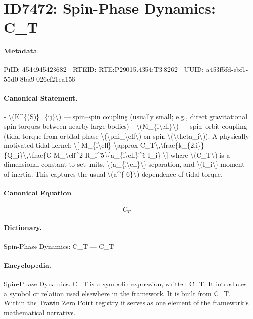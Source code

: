 \section*{ID7472: Spin-Phase Dynamics: C\_T}
\paragraph{Metadata.}
PiID: 4544945423682 | RTEID: RTE:P29015.4354:T3.8262 | UUID: a453f5fd-cbf1-55d0-8ba9-026cf21ea156

\paragraph{Canonical Statement.}
- \textbackslash{}(K\textasciicircum{}\{(S)\}\_\{ij\}\textbackslash{}) — spin–spin coupling (usually small; e.g., direct gravitational spin torques between nearby large bodies) - \textbackslash{}(M\_\{i\textbackslash{}ell\}\textbackslash{}) — spin–orbit coupling (tidal torque from orbital phase \textbackslash{}(\textbackslash{}phi\_\textbackslash{}ell\textbackslash{}) on spin \textbackslash{}(\textbackslash{}theta\_i\textbackslash{})). A physically motivated tidal kernel: \textbackslash{}[ M\_\{i\textbackslash{}ell\} \textbackslash{}approx C\_T\textbackslash{},\textbackslash{}frac\{k\_\{2,i\}\}\{Q\_i\}\textbackslash{},\textbackslash{}frac\{G M\_\textbackslash{}ell\textasciicircum{}2 R\_i\textasciicircum{}5\}\{a\_\{i\textbackslash{}ell\}\textasciicircum{}6 I\_i\} \textbackslash{}] where \textbackslash{}(C\_T\textbackslash{}) is a dimensional constant to set units, \textbackslash{}(a\_\{i\textbackslash{}ell\}\textbackslash{}) separation, and \textbackslash{}(I\_i\textbackslash{}) moment of inertia. This captures the usual \textbackslash{}(a\textasciicircum{}\{-6\}\textbackslash{}) dependence of tidal torque.

\paragraph{Canonical Equation.}
\[
C_T
\]

\paragraph{Dictionary.}
Spin-Phase Dynamics: C\_T — C\_T

\paragraph{Encyclopedia.}
Spin-Phase Dynamics: C\_T is a symbolic expression, written C\_T. It introduces a symbol or relation used elsewhere in the framework. It is built from C\_T. Within the Trawin Zero Point registry it serves as one element of the framework's mathematical narrative.
